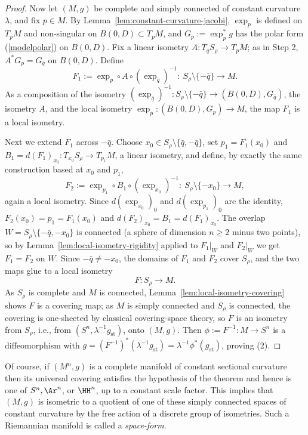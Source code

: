 \begin{proof}
Now let $(M,g)$ be complete and simply connected of constant
curvature $\lambda$, and fix $p\in M$. By
Lemma~\ref{lem:constant-curvature-jacobi}, $\exp_p$ is defined on
$T_pM$ and non-singular on $B(0,D)\subset T_pM$, and
$G_p:=\exp_p^*g$ has the polar form (\ref{modelpolar}) on $B(0,D)$.
Fix a linear isometry $A\colon T_{\bar q}S_\rho\to T_pM$; as in Step
2, $A^*G_p=G_{\bar q}$ on $B(0,D)$. Define
$$F_1:=\exp_p\circ A\circ \left(\exp_{\bar
q}\right)^{-1}\colon\ S_\rho\setminus\{-\bar q\}\longrightarrow M.$$
As a composition of the isometry $(\exp_{\bar q})^{-1}\colon
S_\rho\setminus\{-\bar q\}\to (B(0,D),G_{\bar q})$, the isometry
$A$, and the local isometry $\exp_p\colon (B(0,D),G_p)\to M$, the
map $F_1$ is a local isometry.

Next we extend $F_1$ across $-\bar q$. Choose $x_0\in
S_\rho\setminus\{\bar q,-\bar q\}$, set $p_1=F_1(x_0)$ and
$B_1=d(F_1)_{x_0}\colon T_{x_0}S_\rho\to T_{p_1}M$, a linear
isometry, and define, by exactly the same construction based at
$x_0$ and $p_1$,
$$F_2:=\exp_{p_1}\circ B_1\circ\left(\exp_{x_0}\right)^{-1}
\colon\ S_\rho\setminus\{-x_0\}\longrightarrow M,$$
again a local isometry. Since $d(\exp_{x_0})_0$ and
$d(\exp_{p_1})_0$ are the identity, $F_2(x_0)=p_1=F_1(x_0)$ and
$d(F_2)_{x_0}=B_1=d(F_1)_{x_0}$. The overlap
$W=S_\rho\setminus\{-\bar q,-x_0\}$ is connected (a sphere of
dimension $n\ge 2$ minus two points), so by
Lemma~\ref{lem:local-isometry-rigidity} applied to $F_1|_W$ and
$F_2|_W$ we get $F_1=F_2$ on $W$. Since $-\bar q\not=-x_0$, the
domains of $F_1$ and $F_2$ cover $S_\rho$, and the two maps glue to
a local isometry
$$F\colon S_\rho\longrightarrow M.$$
As $S_\rho$ is complete and $M$ is connected,
Lemma~\ref{lem:local-isometry-covering} shows $F$ is a covering
map; as $M$ is simply connected and $S_\rho$ is connected, the
covering is one-sheeted by classical covering-space theory, so $F$
is an isometry from $S_\rho$, i.e., from $(S^n,
\lambda^{-1}g_\mathrm{st})$, onto $(M,g)$. Then
$\phi:=F^{-1}\colon M\to S^n$ is a diffeomorphism with
$g=(F^{-1})^*\left(\lambda^{-1}g_\mathrm{st}\right)
=\lambda^{-1}\phi^*(g_\mathrm{st})$, proving (2).
\end{proof}

Of course, if $(M^n,g)$ is a complete manifold of constant sectional
curvature then its universal covering satisfies the hypothesis of
the theorem and hence is one of $S^n, \Ar^n$, or $\HH^n$, up
to a constant scale factor. This implies that $(M,g)$ is isometric
to a quotient of one of these simply connected spaces of constant
curvature by the free action of a discrete group of isometries. Such
a Riemannian manifold is called a
\textit{space-form}.


